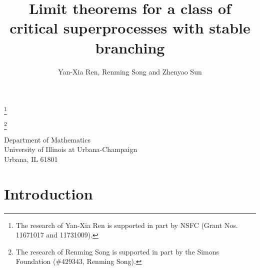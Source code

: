 \documentclass[12pt, a4paper]{amsart}
\theoremstyle{definition}
\numberwithin{equation}{section}
\begin{document}
\title
	[Manuscript]
	{\large Limit theorems for a class of critical superprocesses with stable branching}
\author{Yan-Xia Ren, Renming Song and Zhenyao Sun}
\address
	{Yan-Xia Ren\\
	School of Mathematical Sciences\\
	Peking University\\
	Beijing, P. R. China, 100871}
\thanks{The research of Yan-Xia Ren is supported in part by NSFC (Grant Nos. 11671017  and 11731009).}
\address
	{Renming Song\\
	Dept of Mathematics\\
	University of Illinois at Urbana-Champaign\\
	Urbana, IL 61801}
\thanks{The research of Renming Song is supported in part by the Simons Foundation (\#429343, Renming Song).}
\address
	{Zhenyao Sun\\
	School of Mathematical Sciences\\
	Peking University\\
	Beijing, P. R. China, 100871}
\curraddr
	{Department of Mathematics\\
	University of Illinois at Urbana-Champaign\\
	Urbana, IL 61801}
\begin{abstract}
\end{abstract}
\maketitle
\section{Introduction}
\end{document}
